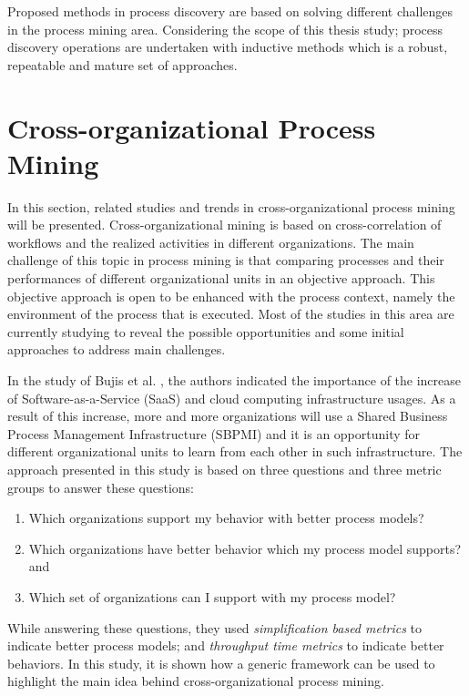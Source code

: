 Proposed methods in process discovery are based on solving different challenges in the process mining area. Considering the scope of this thesis study; process discovery operations are undertaken with inductive methods which is a robust, repeatable and mature set of approaches.

\section{Cross-organizational Process Mining}
\label{sec:cross-organizational-process-mining}
In this section, related studies and trends in cross-organizational process mining will be presented. Cross-organizational mining is based on cross-correlation of workflows and the realized activities in different organizations. The main challenge of this topic in process mining is that comparing processes and their performances of different organizational units in an objective approach. This objective approach is open to be enhanced with the process context, namely the environment of the process that is executed. Most of the studies in this area are currently studying to reveal the possible opportunities and some initial approaches to address main challenges.

In the study of Bujis et al. \cite{buijs2012towards}, the authors indicated the importance of the increase of Software-as-a-Service (SaaS) and cloud computing infrastructure usages. As a result of this increase, more and more organizations will use a Shared Business Process Management Infrastructure (SBPMI) and it is an opportunity for different organizational units to learn from each other in such infrastructure. The approach presented in this study is based on three questions and three metric groups to answer these questions:
\begin{enumerate}
\item Which organizations support my behavior with better process models?
\item Which organizations have better behavior which my process model supports? and
\item Which set of organizations can I support with my process model?
\end{enumerate} While answering these questions, they used \textit{simplification based metrics} to indicate better process models; and \textit{throughput time metrics} to indicate better behaviors. In this study, it is shown how a generic framework can be used to highlight the main idea behind cross-organizational process mining. 

